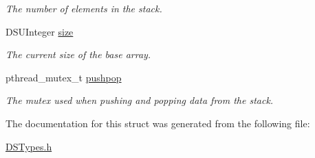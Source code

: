 \begin{DoxyCompactItemize}
\begin{DoxyCompactList}\small\item\em The number of elements in the stack. \item\end{DoxyCompactList}\item 
\hypertarget{struct_d_s_design_space_stack_ad8fde692241cfe9be893d63d9cc061a6}{
DSUInteger \hyperlink{struct_d_s_design_space_stack_ad8fde692241cfe9be893d63d9cc061a6}{size}}
\label{struct_d_s_design_space_stack_ad8fde692241cfe9be893d63d9cc061a6}

\begin{DoxyCompactList}\small\item\em The current size of the base array. \item\end{DoxyCompactList}\item 
\hypertarget{struct_d_s_design_space_stack_a7710776f2028c036203f5b6f77686749}{
pthread\_\-mutex\_\-t \hyperlink{struct_d_s_design_space_stack_a7710776f2028c036203f5b6f77686749}{pushpop}}
\label{struct_d_s_design_space_stack_a7710776f2028c036203f5b6f77686749}

\begin{DoxyCompactList}\small\item\em The mutex used when pushing and popping data from the stack. \item\end{DoxyCompactList}\end{DoxyCompactItemize}


The documentation for this struct was generated from the following file:\begin{DoxyCompactItemize}
\item 
\hyperlink{_d_s_types_8h}{DSTypes.h}\end{DoxyCompactItemize}
